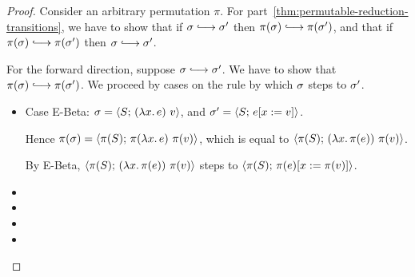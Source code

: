 \begin{proof}
  Consider an arbitrary permutation $\pi$.  For
  part~\ref{thm:permutable-reduction-transitions}, we have to show
  that if $\conf \parstepsto \conf'$ then $\pi(\conf) \parstepsto
  \pi(\conf')$, and that if $\pi(\conf) \parstepsto \pi(\conf')$ then
  $\conf \parstepsto \conf'$.

  For the forward direction, suppose $\conf \parstepsto \conf'$.  We
  have to show that $\pi(\conf) \parstepsto \pi(\conf')$.  We proceed
  by cases on the rule by which $\sigma$ steps to $\sigma'$.

  \begin{itemize}
    \item Case {\sc E-Beta}: $\sigma =
      \langle S;\, (\lambda x.\,e)~v \rangle$, and $\sigma' =
      \langle S;\, e[x := v] \rangle$.

      Hence $\pi(\sigma) =
      \langle \pi(S);\, \pi(\lambda x.\,e)~\pi(v) \rangle$, which is equal
      to $\langle \pi(S);\, (\lambda x.\,\pi(e))~\pi(v) \rangle$.

      By {\sc E-Beta},
      $\langle \pi(S);\, (\lambda x.\,\pi(e))~\pi(v) \rangle$ steps to
      $\langle \pi(S);\, \pi(e)[x := \pi(v)] \rangle$.

    \item {}
    \item {}
    \item {}
    \item {}
  \end{itemize}
\end{proof}
